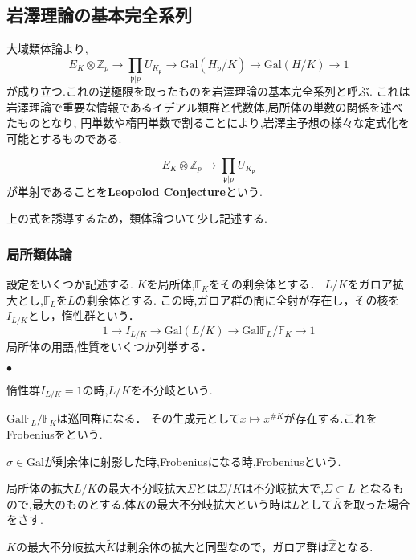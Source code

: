 \documentclass{ujarticle}
\renewenvironment{itemize}%
{%
   \begin{list}{\parbox{1zw}{$\bullet$}}%
   {%
      \setlength{\topsep}{0zh}
      \setlength{\itemindent}{0zw}
      \setlength{\leftmargin}{2zw}%
      \setlength{\rightmargin}{0zw}%
      \setlength{\labelsep}{1zw}%
      \setlength{\labelwidth}{3zw}%
      \setlength{\itemsep}{0em}%
      \setlength{\parsep}{0em}%
      \setlength{\listparindent}{0zw}%
   }
}{%
   \end{list}%
}
\begin{document}
\subsection{岩澤理論の基本完全系列}
\label{sub:基本完全系列}
大域類体論より,
\begin{equation*}
   E_K \otimes \mathbb{Z}_p \to \prod_{\mathfrak{p} | p} U_{K_{\mathfrak{p}}} \to \mathrm{Gal}(H_p/K) \to \mathrm{Gal}(H/K) \to 1
\end{equation*}
が成り立つ.これの逆極限を取ったものを岩澤理論の基本完全系列と呼ぶ.
これは岩澤理論で重要な情報であるイデアル類群と代数体,局所体の単数の関係を述べたものとなり,
円単数や楕円単数で割ることにより,岩澤主予想の様々な定式化を可能とするものである.
\begin{rem}
\begin{equation*}
  E_K\otimes \mathbb{Z}_p \to \prod_{\mathfrak{p} | p} U_{K_{\mathfrak{p}}}
\end{equation*}
が単射であることを\textbf{Leopolod Conjecture}という.
\end{rem}
上の式を誘導するため，類体論ついて少し記述する.
\subsubsection{局所類体論}
\label{sub:局所体類体論}
設定をいくつか記述する.
$K$を局所体,$\mathbb{F}_K$をその剰余体とする．
$L/K$をガロア拡大とし,$\mathbb{F}_L$を$L$の剰余体とする.
この時,ガロア群の間に全射が存在し，その核を$I_{L/K}$とし，惰性群という．
\begin{equation*}
 1 \to I_{L/K} \to \mathrm{Gal}(L/K) \to \mathrm{Gal}{\mathbb{F}_L/\mathbb{F}_K} \to 1
\end{equation*}
局所体の用語,性質をいくつか列挙する．
\begin{itemize}
  \item 惰性群$I_{L/K}={1}$の時,$L/K$を不分岐という.
  \item $\mathrm{Gal}{\mathbb{F}_L/\mathbb{F}_K}$は巡回群になる．
  その生成元として$x \mapsto x^{\#K}$が存在する.これをFrobeniusをという.
  \item $\sigma \in \mathrm{Gal}$が剰余体に射影した時,Frobeniusになる時,Frobeniusという.
  \item 局所体の拡大$L/K$の最大不分岐拡大$\Sigma$とは$\Sigma/K$は不分岐拡大で,$\Sigma \subset L$
  となるもので,最大のものとする.体$K$の最大不分岐拡大という時は$L$として$\overline{K}$を取った場合をさす.
  \item $K$の最大不分岐拡大$\tilde{K}$は剰余体の拡大と同型なので，ガロア群は$\hat{\mathbb{Z}}$となる.
\end{itemize}
\end{document}
